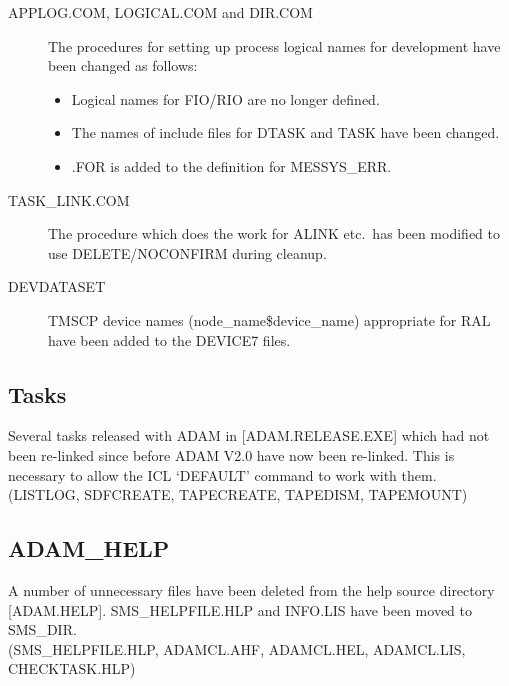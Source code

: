 \begin{description}
\item[APPLOG.COM, LOGICAL.COM and DIR.COM]
The procedures for setting up process logical names for development have been
changed as follows:
\begin{itemize}
\item Logical names for FIO/RIO are no longer defined.
\item The names of include files for DTASK and TASK have been changed.
\item .FOR is added to the definition for MESSYS\_ERR.
\end{itemize}
\item[TASK\_LINK.COM] The procedure which does the work for ALINK etc.\ has been
modified to use DELETE/NOCONFIRM during cleanup.
\item[DEVDATASET] TMSCP device names (node\_name\$device\_name) appropriate for
RAL have been added to the DEVICE7 files.
\end{description}

\subsection{Tasks}
Several tasks released with ADAM in [ADAM.RELEASE.EXE] which had not been
re-linked since before ADAM V2.0 have now been re-linked. This is necessary to
allow the ICL `DEFAULT' command to work with them.\\
(LISTLOG, SDFCREATE, TAPECREATE, TAPEDISM, TAPEMOUNT)

\subsection{ADAM\_HELP}
A number of unnecessary files have been deleted from the help source directory
[ADAM.HELP]. SMS\_HELPFILE.HLP and INFO.LIS have been moved to SMS\_DIR.\\
(SMS\_HELPFILE.HLP, ADAMCL.AHF, ADAMCL.HEL, ADAMCL.LIS, CHECKTASK.HLP)

